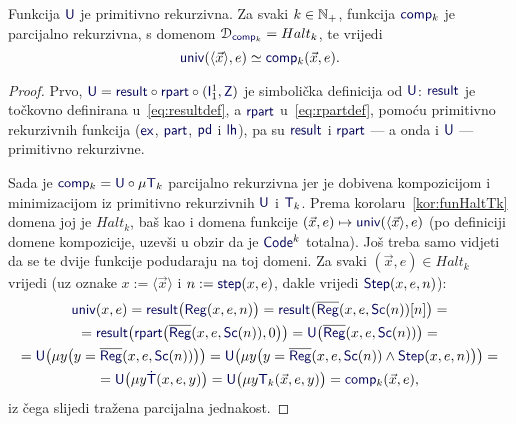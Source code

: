 \begin{propozicija}\label{prop:compspec}
Funkcija $\f U$ je primitivno rekurzivna. Za svaki $k\in{\mathbb N}_+$, funkcija $\f{comp}_k$ je parcijalno rekurzivna, s domenom $\dom{\f{comp}_k}=Halt_k$, te vrijedi \begin{equation}\label{eq:comp=univ}
    \f{univ}(\langle\vec x\rangle,e)\simeq\f{comp}_k(\vec x,e)\text.
\end{equation}
\end{propozicija}
\begin{proof}
Prvo, $\f U=\f{result}\circ\f{rpart}\circ(\f I_1^1,\f Z)$ je simbolička definicija od $\f U$: $\f{result}$ je točkovno definirana u~\eqref{eq:resultdef}, a $\f{rpart}$ u~\eqref{eq:rpartdef}, pomoću primitivno rekurzivnih funkcija ($\f{ex}$, $\f{part}$, $\f{pd}$ i $\f{lh}$), pa su $\f{result}$ i $\f{rpart}$ --- a onda i $\f U$ --- primitivno rekurzivne.

Sada je $\f{comp}_k=\f U\circ\mu\f T_k$ parcijalno rekurzivna jer je dobivena kompozicijom i minimizacijom iz primitivno rekurzivnih $\f U$ i $\f T_k$. Prema korolaru~\ref{kor:funHaltTk} domena joj je $Halt_k$, baš kao i domena funkcije $(\vec x,e)\mapsto\f{univ}(\langle\vec x\rangle,e)$ (po definiciji domene kompozicije, uzevši u obzir da je $\f{Code}^k$ totalna). Još treba samo vidjeti da se te dvije funkcije podudaraju na toj domeni. Za svaki $(\vec x,e)\in Halt_k$ vrijedi (uz oznake $x:=\langle\vec x\rangle$ i $n:=\f{step}(x,e)$, dakle vrijedi $\f{Step}(x,e,n)$):
\begin{multline}
    \f{univ}(x,e)=
    \f{result}\bigl(\f{Reg}(x,e,n)\bigr)=
    \f{result}\bigl(\overline{\f{Reg}}(x,e,\f{Sc}(n))[n]\bigr)=\\
    =
    \f{result}\bigl(\f{rpart}\bigl(\overline{\f{Reg}}(x,e,\f{Sc}(n)),0\bigr)\bigr)=
    \f U\bigl(\overline{\f{Reg}}(x,e,\f{Sc}(n))\bigr)
    =\\
    =\f U\bigl(\mu y\bigl(y=\overline{\f{Reg}}(x,e,\f{Sc}(n))\bigr)\bigr)=
    \f U\bigl(\mu y\bigl(y=\overline{\f{Reg}}(x,e,\f{Sc}(n))\land\f{Step}(x,e,n)\bigr)\bigr)=\\
    =\f U\bigl(\mu y\f{\dot T}(x,e,y)\bigr)=
    \f U\bigl(\mu y\f T_k(\vec x,e,y)\bigr)=
    \f{comp}_k(\vec x,e)\text,
\end{multline}
iz čega slijedi tražena parcijalna jednakost.
\end{proof}


